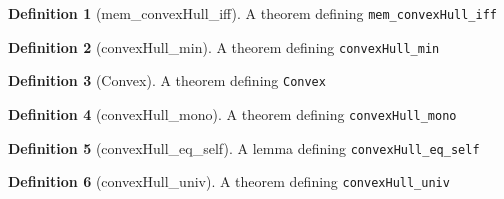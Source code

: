 \documentclass{article}
\theoremstyle{definition}
\newtheorem{definition}{Definition}
\begin{document}
\begin{definition}[mem_convexHull_iff]
A theorem defining \texttt{mem_convexHull_iff}
\end{definition}

\begin{definition}[convexHull_min]
A theorem defining \texttt{convexHull_min}
\end{definition}

\begin{definition}[Convex]
A theorem defining \texttt{Convex}
\end{definition}

\begin{definition}[convexHull_mono]
A theorem defining \texttt{convexHull_mono}
\end{definition}

\begin{definition}[convexHull_eq_self]
A lemma defining \texttt{convexHull_eq_self}
\end{definition}

\begin{definition}[convexHull_univ]
A theorem defining \texttt{convexHull_univ}
\end{definition}
\end{document}
